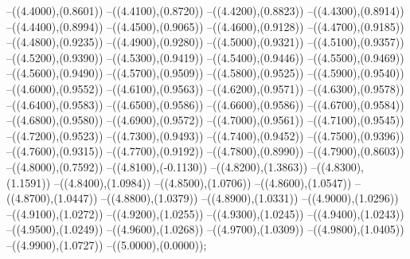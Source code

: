 {	--({\sx*(4.4000)},{\sy*(0.8601)})
	--({\sx*(4.4100)},{\sy*(0.8720)})
	--({\sx*(4.4200)},{\sy*(0.8823)})
	--({\sx*(4.4300)},{\sy*(0.8914)})
	--({\sx*(4.4400)},{\sy*(0.8994)})
	--({\sx*(4.4500)},{\sy*(0.9065)})
	--({\sx*(4.4600)},{\sy*(0.9128)})
	--({\sx*(4.4700)},{\sy*(0.9185)})
	--({\sx*(4.4800)},{\sy*(0.9235)})
	--({\sx*(4.4900)},{\sy*(0.9280)})
	--({\sx*(4.5000)},{\sy*(0.9321)})
	--({\sx*(4.5100)},{\sy*(0.9357)})
	--({\sx*(4.5200)},{\sy*(0.9390)})
	--({\sx*(4.5300)},{\sy*(0.9419)})
	--({\sx*(4.5400)},{\sy*(0.9446)})
	--({\sx*(4.5500)},{\sy*(0.9469)})
	--({\sx*(4.5600)},{\sy*(0.9490)})
	--({\sx*(4.5700)},{\sy*(0.9509)})
	--({\sx*(4.5800)},{\sy*(0.9525)})
	--({\sx*(4.5900)},{\sy*(0.9540)})
	--({\sx*(4.6000)},{\sy*(0.9552)})
	--({\sx*(4.6100)},{\sy*(0.9563)})
	--({\sx*(4.6200)},{\sy*(0.9571)})
	--({\sx*(4.6300)},{\sy*(0.9578)})
	--({\sx*(4.6400)},{\sy*(0.9583)})
	--({\sx*(4.6500)},{\sy*(0.9586)})
	--({\sx*(4.6600)},{\sy*(0.9586)})
	--({\sx*(4.6700)},{\sy*(0.9584)})
	--({\sx*(4.6800)},{\sy*(0.9580)})
	--({\sx*(4.6900)},{\sy*(0.9572)})
	--({\sx*(4.7000)},{\sy*(0.9561)})
	--({\sx*(4.7100)},{\sy*(0.9545)})
	--({\sx*(4.7200)},{\sy*(0.9523)})
	--({\sx*(4.7300)},{\sy*(0.9493)})
	--({\sx*(4.7400)},{\sy*(0.9452)})
	--({\sx*(4.7500)},{\sy*(0.9396)})
	--({\sx*(4.7600)},{\sy*(0.9315)})
	--({\sx*(4.7700)},{\sy*(0.9192)})
	--({\sx*(4.7800)},{\sy*(0.8990)})
	--({\sx*(4.7900)},{\sy*(0.8603)})
	--({\sx*(4.8000)},{\sy*(0.7592)})
	--({\sx*(4.8100)},{\sy*(-0.1130)})
	--({\sx*(4.8200)},{\sy*(1.3863)})
	--({\sx*(4.8300)},{\sy*(1.1591)})
	--({\sx*(4.8400)},{\sy*(1.0984)})
	--({\sx*(4.8500)},{\sy*(1.0706)})
	--({\sx*(4.8600)},{\sy*(1.0547)})
	--({\sx*(4.8700)},{\sy*(1.0447)})
	--({\sx*(4.8800)},{\sy*(1.0379)})
	--({\sx*(4.8900)},{\sy*(1.0331)})
	--({\sx*(4.9000)},{\sy*(1.0296)})
	--({\sx*(4.9100)},{\sy*(1.0272)})
	--({\sx*(4.9200)},{\sy*(1.0255)})
	--({\sx*(4.9300)},{\sy*(1.0245)})
	--({\sx*(4.9400)},{\sy*(1.0243)})
	--({\sx*(4.9500)},{\sy*(1.0249)})
	--({\sx*(4.9600)},{\sy*(1.0268)})
	--({\sx*(4.9700)},{\sy*(1.0309)})
	--({\sx*(4.9800)},{\sy*(1.0405)})
	--({\sx*(4.9900)},{\sy*(1.0727)})
	--({\sx*(5.0000)},{\sy*(0.0000)});
}

